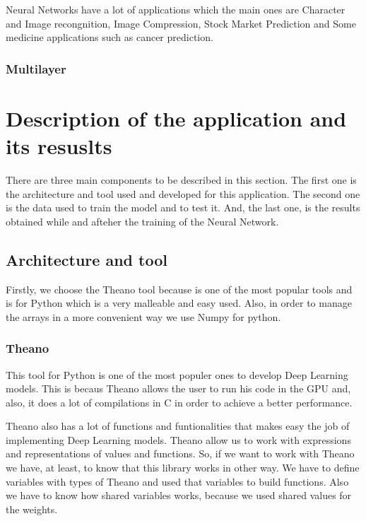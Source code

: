 \documentclass[12pt]{article}
\begin{document}
Neural Networks have a lot of applications which the main ones are Character and Image recongnition, Image Compression, Stock Market Prediction and Some medicine applications such as cancer prediction.
\subsubsection{Multilayer}

\section{Description of the application and its resuslts}

There are three main components to be described in this section. The first one is the architecture and tool used and developed for this application. The second one is the data used to train the model and to test it. And, the last one, is the results obtained while and afteher the training of the Neural Network.

\subsection{Architecture and tool}

Firstly, we choose the Theano tool because is one of the most popular tools and is for Python which is a very malleable and easy used. Also, in order to manage the arrays in a more convenient way we use Numpy for python.

\subsubsection{Theano\cite{2016arXiv160502688full}}
This tool for Python is one of the most populer ones to develop Deep Learning models. This is becaus Theano allows the user to run his code in the GPU and, also, it does a lot of compilations in C in order to achieve a better performance.

Theano also has a lot of functions and funtionalities that makes easy the job of implementing Deep Learning models. Theano allow us to work with expressions and representations of values and functions. So, if we want to work with Theano we have, at least, to know that this library works in other way. We have to define variables with types of Theano and used that variables to build functions. Also we have to know how shared variables works, because we used shared values for the weights.
\end{document}
